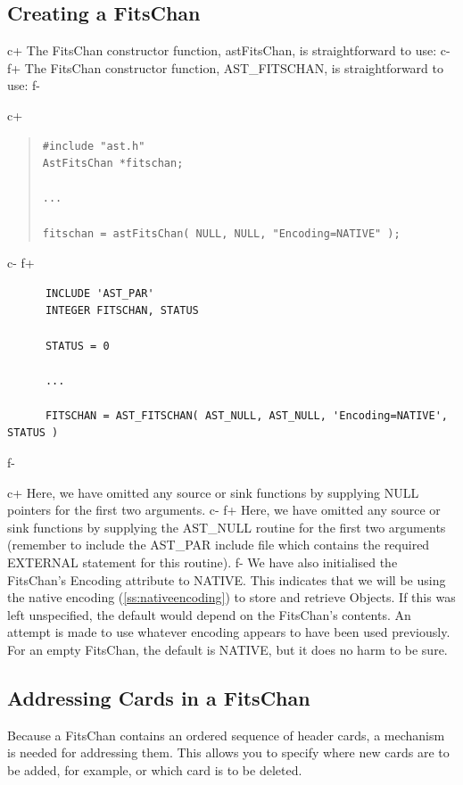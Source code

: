 \documentclass[twoside,11pt]{article}
\newcommand{\secref}[1]{\S\ref{#1}}
\renewcommand{\secref}[1]{\ref{#1}}
\begin{document}
\subsection{\label{ss:creatingafitschan}Creating a FitsChan}

c+
The FitsChan constructor function, astFitsChan, is straightforward to
use:
c-
f+
The FitsChan constructor function, AST\_FITSCHAN, is straightforward
to use:
f-

c+
\begin{quote}
\small
\begin{verbatim}
#include "ast.h"
AstFitsChan *fitschan;

...

fitschan = astFitsChan( NULL, NULL, "Encoding=NATIVE" );
\end{verbatim}
\normalsize
\end{quote}
c-
f+
\small
\begin{verbatim}
      INCLUDE 'AST_PAR'
      INTEGER FITSCHAN, STATUS

      STATUS = 0

      ...

      FITSCHAN = AST_FITSCHAN( AST_NULL, AST_NULL, 'Encoding=NATIVE', STATUS )
\end{verbatim}
\normalsize
f-

c+
Here, we have omitted any source or sink functions by supplying NULL
pointers for the first two arguments.
c-
f+
Here, we have omitted any source or sink functions by supplying the
AST\_NULL routine for the first two arguments (remember to include the
AST\_PAR include file which contains the required EXTERNAL statement
for this routine).
f-
We have also initialised the FitsChan's Encoding attribute to
NATIVE. This indicates that we will be using the native encoding
(\secref{ss:nativeencoding}) to store and retrieve Objects. If this
was left unspecified, the default would depend on the FitsChan's
contents. An attempt is made to use whatever encoding appears to have
been used previously. For an empty FitsChan, the default is NATIVE,
but it does no harm to be sure.

\subsection{\label{ss:addressingfitscards}Addressing Cards in a FitsChan}

Because a FitsChan contains an ordered sequence of header cards, a
mechanism is needed for addressing them. This allows you to specify
where new cards are to be added, for example, or which card is to be
deleted.
\end{document}
